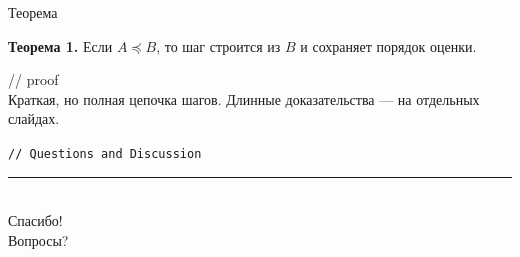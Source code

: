 \documentclass[aspectratio=169,10pt]{beamer}
\begin{document}
\begin{frame}{Теорема}
\begin{tcolorbox}[thmbox]
{\color{accentorange}\bfseries Теорема 1.} Если $A\preceq B$, то шаг строится из $B$ и сохраняет порядок оценки.
\end{tcolorbox}
{\color{accent}\ttfamily\small // proof}\\
Краткая, но полная цепочка шагов. Длинные доказательства — на отдельных слайдах.
\end{frame}

\begin{frame}[plain]
  \vfill
  \begin{center}
    {\color{accent}\texttt{\small // Questions and Discussion}}\\[0.25cm]
    {\color{border}\rule{0.72\textwidth}{0.4pt}}\\[0.35cm]
    {\color{accent}\Huge\ttfamily Спасибо!}\\[0.25cm]
    {\color{accentblue}\large Вопросы?}
  \end{center}
  \vfill
\end{frame}
\end{document}
